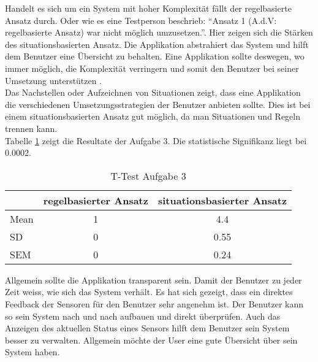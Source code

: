 Handelt es sich um ein System mit hoher Komplexität fällt der regelbasierte Ansatz durch. Oder wie es eine Testperson beschrieb: \enquote{Ansatz 1 (A.d.V: regelbasierte Ansatz) war nicht möglich umzusetzen.}. Hier zeigen sich die Stärken des situationsbasierten Ansatz. Die Applikation abstrahiert das System und hilft dem Benutzer eine Übersicht zu behalten. Eine Applikation sollte deswegen, wo immer möglich, die Komplexität verringern und somit den Benutzer bei seiner Umsetzung unterstützen\cite{simple, gut2} .\\
Das Nachstellen oder Aufzeichnen von Situationen zeigt, dass eine Applikation die verschiedenen Umsetzungsstrategien der Benutzer anbieten sollte. Dies ist bei einem situationsbasierten Ansatz gut möglich, da man Situationen und Regeln trennen kann.\\
Tabelle \ref{tab:auf3} zeigt die Resultate der Aufgabe 3. Die statistische Signifikanz liegt bei 0.0002.\\[2ex]
\begin{table}[h]
\centering
\begin{tabular}{@{} l | c | c @{}}
 & regelbasierter Ansatz & situationsbasierter Ansatz \\ \hline
 Mean & 1  & 4.4  \\ \hline
 SD & 0  & 0.55  \\ \hline
 SEM & 0  & 0.24  \\ \midrule
 \end{tabular}
\caption{\label{tab:auf3}T-Test Aufgabe 3}
\end{table}

Allgemein sollte die Applikation transparent sein. Damit der Benutzer zu jeder Zeit weiss, wie sich das System verhält. Es hat sich gezeigt, dass ein direktes Feedback der Sensoren für den Benutzer sehr angenehm ist. Der Benutzer kann so sein System nach und nach aufbauen und direkt überprüfen. Auch das Anzeigen des aktuellen Status eines Sensors hilft dem Benutzer sein System besser zu verwalten. Allgemein möchte der User eine gute Übersicht über sein System haben.\cite{gut2, gut}
%
%
